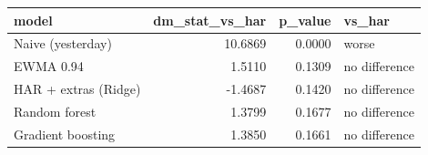 \begin{tabular}{lrrl}
\toprule
model & dm_stat_vs_har & p_value & vs_har \\
\midrule
Naive (yesterday) & 10.6869 & 0.0000 & worse \\
EWMA 0.94 & 1.5110 & 0.1309 & no difference \\
HAR + extras (Ridge) & -1.4687 & 0.1420 & no difference \\
Random forest & 1.3799 & 0.1677 & no difference \\
Gradient boosting & 1.3850 & 0.1661 & no difference \\
\bottomrule
\end{tabular}
